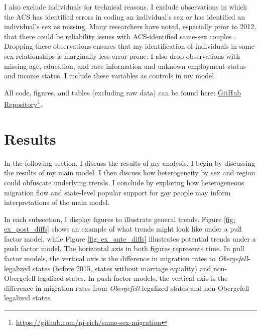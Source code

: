 \documentclass[12pt,letterpaper]{article}
\begin{document}
I also exclude individuals for technical reasons. I exclude observations in which the ACS has identified errors in coding an individual’s sex or has identified an individual’s sex as missing. Many researchers have noted, especially prior to 2012, that there could be reliability issues with ACS-identified same-sex couples \citep{3, 5, 7, 12}. Dropping these observations ensures that my identification of individuals in same-sex relationships is marginally less error-prone. I also drop observations with missing age, education, and race information and unknown employment status and income status. I include these variables as controls in my model.

All code, figures, and tables (excluding raw data) can be found here: \href{https://github.com/nj-rich/same-sex-migration}{GitHub Repository}\footnote{\url{https://github.com/nj-rich/same-sex-migration}}.

\FloatBarrier
\section{Results}
In the following section, I discuss the results of my analysis. I begin by discussing the results of my main model. I then discuss how heterogeneity by sex and region could obfuscate underlying trends. I conclude by exploring how heterogeneous migration flow and state-level popular support for gay people may inform interpretations of the main model.

In each subsection, I display figures to illustrate general trends. Figure \ref{fig: ex_post_diffs} shows an example of what trends might look like under a pull factor model, while Figure \ref{fig: ex_ante_diffs} illustrates potential trends under a push factor model.  The horizontal axis in both figures represents time. In pull factor models, the vertical axis is the difference in migration rates to \textit{Obergefell}-legalized states (before 2015, states without marriage equality) and non-Obergefell legalized states. In push factor models, the vertical axis is the difference in migration rates from \textit{Obergefell}-legalized states and non-Obergefell legalized states. 
\end{document}
